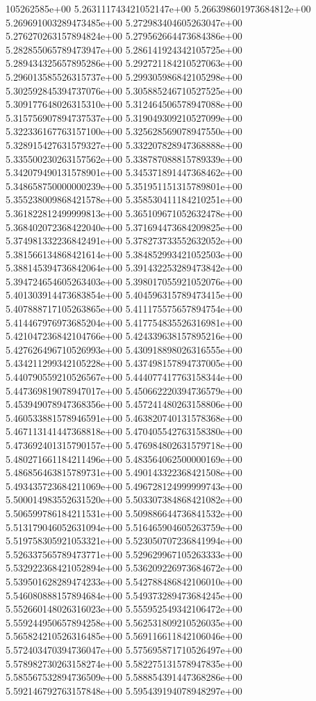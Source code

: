 105262585e+00	5.263111743421052147e+00	5.266398601973684812e+00	5.269691003289473485e+00	5.272983404605263047e+00	5.276270263157894824e+00	5.279562664473684386e+00	5.282855065789473947e+00	5.286141924342105725e+00	5.289434325657895286e+00	5.292721184210527063e+00	5.296013585526315737e+00	5.299305986842105298e+00	5.302592845394737076e+00	5.305885246710527525e+00	5.309177648026315310e+00	5.312464506578947088e+00	5.315756907894737537e+00	5.319049309210527099e+00	5.322336167763157100e+00	5.325628569078947550e+00	5.328915427631579327e+00	5.332207828947368888e+00	5.335500230263157562e+00	5.338787088815789339e+00	5.342079490131578901e+00	5.345371891447368462e+00	5.348658750000000239e+00	5.351951151315789801e+00	5.355238009868421578e+00	5.358530411184210251e+00	5.361822812499999813e+00	5.365109671052632478e+00	5.368402072368422040e+00	5.371694473684209825e+00	5.374981332236842491e+00	5.378273733552632052e+00	5.381566134868421614e+00	5.384852993421052503e+00	5.388145394736842064e+00	5.391432253289473842e+00	5.394724654605263403e+00	5.398017055921052076e+00	5.401303914473683854e+00	5.404596315789473415e+00	5.407888717105263865e+00	5.411175575657894754e+00	5.414467976973685204e+00	5.417754835526316981e+00	5.421047236842104766e+00	5.424339638157895216e+00	5.427626496710526993e+00	5.430918898026316555e+00	5.434211299342105228e+00	5.437498157894737005e+00	5.440790559210526567e+00	5.444077417763158344e+00	5.447369819078947017e+00	5.450662220394736579e+00	5.453949078947368356e+00	5.457241480263158806e+00	5.460533881578946591e+00	5.463820740131578368e+00	5.467113141447368818e+00	5.470405542763158380e+00	5.473692401315790157e+00	5.476984802631579718e+00	5.480271661184211496e+00	5.483564062500000169e+00	5.486856463815789731e+00	5.490143322368421508e+00	5.493435723684211069e+00	5.496728124999999743e+00	5.500014983552631520e+00	5.503307384868421082e+00	5.506599786184211531e+00	5.509886644736841532e+00	5.513179046052631094e+00	5.516465904605263759e+00	5.519758305921053321e+00	5.523050707236841994e+00	5.526337565789473771e+00	5.529629967105263333e+00	5.532922368421052894e+00	5.536209226973684672e+00	5.539501628289474233e+00	5.542788486842106010e+00	5.546080888157894684e+00	5.549373289473684245e+00	5.552660148026316023e+00	5.555952549342106472e+00	5.559244950657894258e+00	5.562531809210526035e+00	5.565824210526316485e+00	5.569116611842106046e+00	5.572403470394736047e+00	5.575695871710526497e+00	5.578982730263158274e+00	5.582275131578947835e+00	5.585567532894736509e+00	5.588854391447368286e+00	5.592146792763157848e+00	5.595439194078948297e+00
